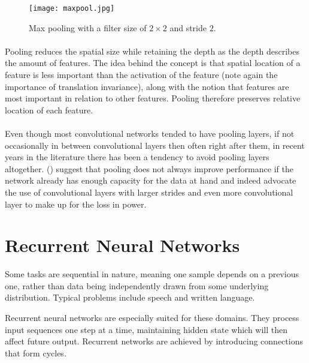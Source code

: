 \begin{figure}[htpb]
  \centering
  \texttt{[image: maxpool.jpg]}
  \caption[Max pooling]{
    Max pooling with a filter size of $2 \times 2$
    and stride $2$.
  }
  \label{fig:maxpool}
\end{figure}

\paragraph{}
Pooling reduces the spatial size
while retaining the depth
as the depth describes the amount of features.
The idea behind the concept
is that spatial location of a feature is less important
than the activation of the feature
(note again the importance of translation invariance),
along with the notion that features are most important
in relation to other features.
Pooling therefore preserves relative location of each feature.

\paragraph{}
Even though most convolutional networks
tended to have pooling layers,
if not occasionally in between convolutional layers
then often right after them,
in recent years in the literature
there has been a tendency to avoid pooling layers altogether.
\citeauthor{Springenberg2015}
(\citeyear{Springenberg2015})
suggest that pooling does not always improve performance
if the network already has enough capacity for the data at hand
and indeed advocate the use of convolutional layers
with larger strides
and even more convolutional layer
to make up for the loss in power.

\section{Recurrent Neural Networks}
\label{sec:rnn}
Some tasks are sequential in nature,
meaning one sample depends on a previous one,
rather than data being independently
drawn from some underlying distribution.
Typical problems include speech and written language.

Recurrent neural networks are especially suited
for these domains.
They process input sequences one step at a time,
maintaining hidden state which will then
affect future output.
Recurrent networks are achieved
by introducing connections that form cycles.

